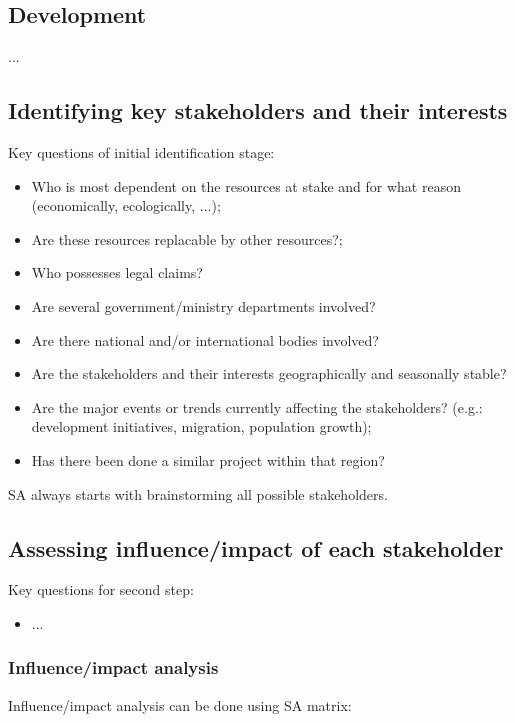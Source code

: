 \documentclass{article}
\begin{document}
\subsection{Development}
...

\subsection{Identifying key stakeholders and their interests}
Key questions of initial identification stage:
\begin{itemize}
    \item Who is most dependent on the resources at stake and for what reason (economically, ecologically, ...);
    \item Are these resources replacable by other resources?;
    \item Who possesses legal claims?
    \item Are several government/ministry departments involved?
    \item Are there national and/or international bodies involved?
    \item Are the stakeholders and their interests geographically and seasonally stable?
    \item Are the major events or trends currently affecting the stakeholders? (e.g.: development initiatives, migration, population growth);
    \item Has there been done a similar project within that region?
\end{itemize}

SA always starts with brainstorming all possible stakeholders.

\subsection{Assessing influence/impact of each stakeholder}
Key questions for second step:
\begin{itemize}
    \item ...
\end{itemize}

\subsubsection{Influence/impact analysis}
Influence/impact analysis can be done using SA matrix:
\end{document}
